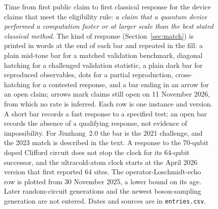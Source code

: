 \begin{figure}[htbp]
\caption[Time from quantum claim to classical response]{Time from first public claim to first classical response for the \nTimeline{} device claims that meet the eligibility rule: \emph{a claim that a quantum device performed a computation faster or at larger scale than the best stated classical method}. The kind of response (Section~\ref{sec:match}) is printed in words at the end of each bar and repeated in the fill: a plain mid-tone bar for a matched validation benchmark, diagonal hatching for a challenged validation statistic, a plain dark bar for reproduced observables, dots for a partial reproduction, cross-hatching for a contested response, and a bar ending in an arrow for an open claim; arrows mark claims still open on 11 November 2026, from which no rate is inferred. Each row is one instance and version. A short bar records a fast response to a specified test; an open bar records the absence of a qualifying response, not evidence of impossibility. For Jiuzhang~2.0 the bar is the 2021 challenge, and the 2023 match is described in the text. A response to the 70-qubit doped Clifford circuit does not stop the clock for its 64-qubit successor, and the ultracold-atom clock starts at the April 2026 version that first reported 64 sites. The operator-Loschmidt-echo row is plotted from 30 November 2025, a lower bound on its age. Later random-circuit generations and the newest boson-sampling generation are not entered. Dates and sources are in \texttt{entries.csv}.}
\label{fig:timeline}
\end{figure}
